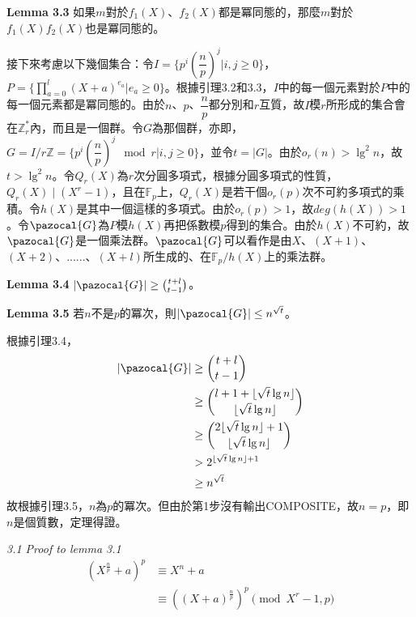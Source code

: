 \documentclass{article}
\DeclarePairedDelimiter\floor{\lfloor}{\rfloor}
\newcommand{\Gc}{\pazocal{G}}
\begin{document}
\begin{mdframed}
\noindent\textbf{Lemma 3.3} 如果$m$對於$f_1(X)$、$f_2(X)$都是冪同態的，那麼$m$對於$f_1(X)f_2(X)$也是冪同態的。
\end{mdframed}

    接下來考慮以下幾個集合：令$I=\{p^i(\dfrac{n}{p})^j|i, j\geq 0\}$，$P=\{\prod\limits_{a=0}^{l}(X+a)^{e_a}|e_a\geq 0\}$。根據引理3.2和3.3，$I$中的每一個元素對於$P$中的每一個元素都是冪同態的。由於$n$、$p$、$\dfrac{n}{p}$都分別和$r$互質，故$I$模$r$所形成的集合會在$\mathbb{Z}_r^*$內，而且是一個群。令$G$為那個群，亦即，$G=I/r\mathbb{Z}=\{p^i(\dfrac{n}{p})^j \mod r|i, j\geq 0\}$，並令$t=|G|$。由於$o_r(n)>\lg^2n$，故$t>\lg^2n$。令$Q_r(X)$為$r$次分圓多項式，根據分圓多項式的性質，$Q_r(X)\mid (X^r-1)$，且在$\mathbb{F}_p$上，$Q_r(X)$是若干個$o_r(p)$次不可約多項式的乘積。令$h(X)$是其中一個這樣的多項式。由於$o_r(p)>1$，故$deg(h(X))>1$。令$\Gc$為$P$模$h(X)$再把係數模$p$得到的集合。由於$h(X)$不可約，故$\Gc$是一個乘法群。$\Gc$可以看作是由$X$、$(X+1)$、$(X+2)$、......、$(X+l)$所生成的、在$\mathbb{F}_p/h(X)$上的乘法群。

\begin{mdframed}
\noindent\textbf{Lemma 3.4} $|\Gc|\geq\binom{t+l}{t-1}$。
\end{mdframed}

\begin{mdframed}
\noindent\textbf{Lemma 3.5} 若$n$不是$p$的冪次，則$|\Gc|\leq n^{\sqrt{t}}$。
\end{mdframed}

    根據引理3.4，
        \begin{align*}
        |\Gc| &\geq \binom{t+l}{t-1}\\
              &\geq \binom{l+1+\floor{\sqrt{t}\lg n}}{\floor{\sqrt{t}\lg n}}\\
              &\geq \binom{2\floor{\sqrt{t}\lg n}+1}{\floor{\sqrt{t}\lg n}}\\
              &> 2^{\floor{\sqrt{t}\lg n}+1}\\
              &\geq n^{\sqrt{t}}
        \end{align*}
    故根據引理3.5，$n$為$p$的冪次。但由於第1步沒有輸出COMPOSITE，故$n=p$，即$n$是個質數，定理得證。

\noindent\textit{3.1 Proof to lemma 3.1}
    \begin{align*}
    (X^{\frac{n}{p}}+a)^p&\equiv X^n+a\\
                         &\equiv ((X+a)^{\frac{n}{p}})^p\pmod{X^r-1,p}
    \end{align*}
\end{document}
